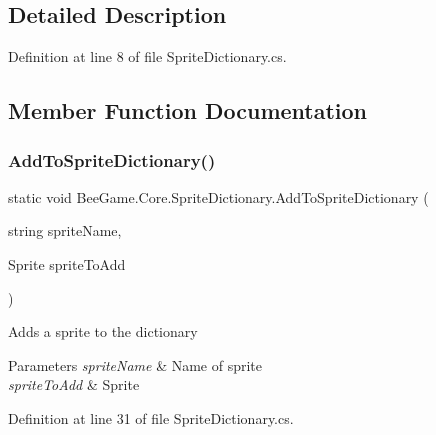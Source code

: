 \subsection{Detailed Description}


Definition at line 8 of file Sprite\+Dictionary.\+cs.



\subsection{Member Function Documentation}
\mbox{\label{class_bee_game_1_1_core_1_1_sprite_dictionary_a55f237ff9c91a35b88adab2a4be844ed}} 
\subsubsection{\texorpdfstring{Add\+To\+Sprite\+Dictionary()}{AddToSpriteDictionary()}}
{\footnotesize\ttfamily static void Bee\+Game.\+Core.\+Sprite\+Dictionary.\+Add\+To\+Sprite\+Dictionary (\begin{DoxyParamCaption}\item[{string}]{sprite\+Name,  }\item[{Sprite}]{sprite\+To\+Add }\end{DoxyParamCaption})\hspace{0.3cm}{\ttfamily [static]}}



Adds a sprite to the dictionary 


\begin{DoxyParams}{Parameters}
{\em sprite\+Name} & Name of sprite\\
\hline
{\em sprite\+To\+Add} & Sprite\\
\hline
\end{DoxyParams}


Definition at line 31 of file Sprite\+Dictionary.\+cs.


